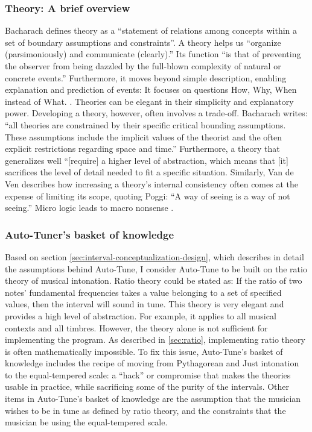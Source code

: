 \subsubsection{Theory: A brief overview}
\label{sec:theory}
Bacharach defines theory as a ``statement of relations among concepts within a set of boundary assumptions and constraints''. A theory helps us ``organize (parsimoniously) and communicate (clearly).'' \cite{bacharach1989organizational} Its function ``is that of preventing the observer from being dazzled by the full-blown complexity of natural or concrete events.'' \cite{hall1957theories} Furthermore, it moves beyond simple description, enabling explanation and prediction of events: It focuses on questions How, Why, When instead of What. \cite{bacharach1989organizational}. Theories can be elegant in their simplicity and explanatory power. Developing a theory, however, often involves a trade-off. Bacharach writes: ``all theories are constrained by their specific critical bounding assumptions. These assumptions include the implicit values of the theorist and the often explicit restrictions regarding space and time.'' Furthermore, a theory that generalizes well ``[require] a higher level of abstraction, which means that [it] sacrifices the level of detail needed to fit a specific situation. Similarly, Van de Ven describes how increasing a theory's internal consistency often comes at the expense of limiting its scope, quoting Poggi: ``A way of seeing is a way of not seeing.'' \cite{poggi1965main} Micro logic leads to macro nonsense \cite{van1989nothing}.

\subsubsection{Auto-Tuner's basket of knowledge}
Based on section \ref{sec:interval-conceptualization-design}, which describes in detail the assumptions behind Auto-Tune, I consider Auto-Tune to be built on the ratio theory of musical intonation. Ratio theory could be stated as: If the ratio of two notes' fundamental frequencies takes a value belonging to a set of specified values, then the interval will sound in tune. This theory is very elegant and provides a high level of abstraction. For example, it applies to all musical contexts and all timbres. However, the theory alone is not sufficient for implementing the program. As described in \ref{sec:ratio}, implementing ratio theory is often mathematically impossible. To fix this issue, Auto-Tune's basket of knowledge includes the recipe of moving from Pythagorean and Just intonation to the equal-tempered scale: a ``hack'' or compromise that makes the theories usable in practice, while sacrificing some of the purity of the intervals. Other items in Auto-Tune's basket of knowledge are the assumption that the musician wishes to be in tune as defined by ratio theory, and the constraints that the musician be using the equal-tempered scale.

